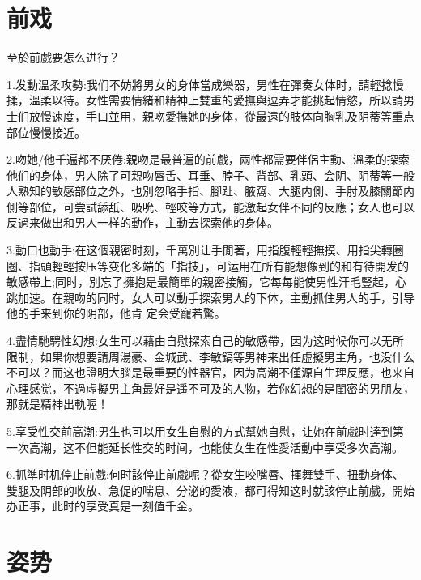 \documentclass[12pt,UTF8]{ctexbook}
\begin{document}
\chapter{前戏}

至於前戲要怎么进行？

1.发動溫柔攻勢:我们不妨將男女的身体當成樂器，男性在彈奏女体时，請輕捻慢揉，溫柔以待。女性需要情緒和精神上雙重的愛撫與逗弄才能挑起情慾，所以請男士们放慢速度，手口並用，親吻愛撫她的身体，從最遠的肢体向胸乳及阴蒂等重点部位慢慢接近。

2.吻她/他千遍都不厌倦:親吻是最普遍的前戲，兩性都需要伴侶主動、溫柔的探索他们的身体，男人除了可親吻唇舌、耳垂、脖子、背部、乳頭、会阴、阴蒂等一般人熟知的敏感部位之外，也別忽略手指、腳趾、腋窩、大腿内側、手肘及膝關節内側等部位，可尝試舔舐、吸吮、輕咬等方式，能激起女伴不同的反應；女人也可以反過来做出和男人一样的動作，主動去探索他的身体。

3.動口也動手:在这個親密时刻，千萬別让手閒著，用指腹輕輕撫摸、用指尖轉圈圈、指頭輕輕按压等变化多端的「指技」，可运用在所有能想像到的和有待開发的敏感帶上;同时，別忘了擁抱是最簡單的親密接觸，它每每能使男性汗毛豎起，心跳加速。在親吻的同时，女人可以動手探索男人的下体，主動抓住男人的手，引导他的手来到你的阴部，他肯
定会受寵若驚。

4.盡情馳騁性幻想:女生可以藉由自慰探索自己的敏感帶，因为这时候你可以无所限制，如果你想要請周湯豪、金城武、李敏鎬等男神来出任虛擬男主角，也没什么不可以？而这也證明大腦是最重要的性器官，因为高潮不僅源自生理反應，也来自心理感觉，不過虛擬男主角最好是遥不可及的人物，若你幻想的是閨密的男朋友，那就是精神出軌喔！

5.享受性交前高潮:男生也可以用女生自慰的方式幫她自慰，让她在前戲时達到第一次高潮，这不但能延长性交的时间，也能使女生在性愛活動中享受多次高潮。

6.抓準时机停止前戲:何时該停止前戲呢？從女生咬嘴唇、揮舞雙手、扭動身体、雙腿及阴部的收放、急促的喘息、分泌的愛液，都可得知这时就該停止前戲，開始办正事，此时的享受真是一刻值千金。

\chapter{姿势}
\end{document}

